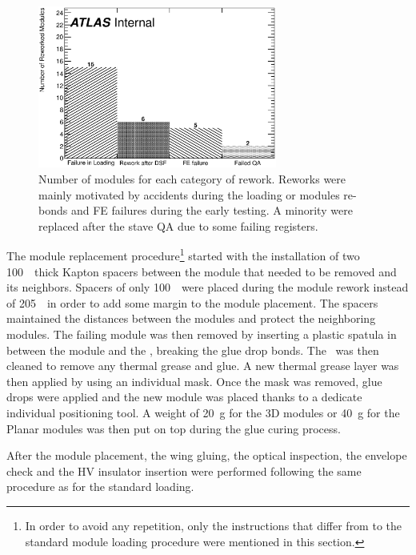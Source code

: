 \begin{figure}
	\centering
        \includegraphics[width=0.7\textwidth]{Images/ibl_stave_loading/MainRework/reworked_modules.eps}
        \caption{Number of modules for each category of rework. Reworks were mainly motivated by accidents during the loading or modules re-bonds and FE failures during the early testing. A minority were replaced after the stave QA due to some failing registers.}
        \label{fig:ReworkModules}
\end{figure}

The module replacement procedure\footnote{In order to avoid any repetition, only the instructions that differ from to the standard module loading procedure were mentioned in this section.} started with the installation of two 100~\microm\ thick Kapton spacers between the module that needed to be removed and its neighbors. Spacers of only 100~\microm\ were placed during the module rework instead of 205~\microm\ in order to add some margin to the module placement.
The spacers maintained the distances between the modules and protect the neighboring modules. The failing module was then removed by inserting a plastic spatula in between the module and the \faceplate, breaking the glue drop bonds. The \faceplate\ was then cleaned to remove any thermal grease and glue. A new thermal grease layer was then applied by using an individual mask. Once the mask was removed, glue drops were applied and the new module was placed thanks to a dedicate individual positioning tool. A weight of 20~g for the 3D modules or 40~g for the Planar  modules was then put on top during the glue curing process.

After the module placement, the wing gluing, the optical inspection, the envelope check and the HV insulator insertion were performed following the same procedure as for the standard loading.

